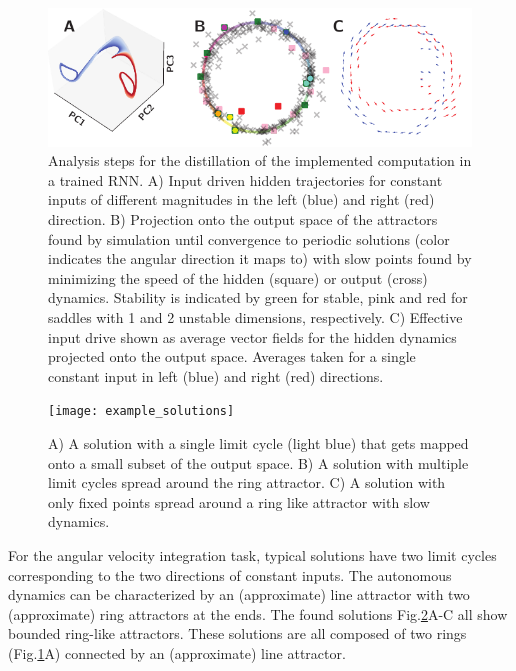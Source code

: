 \documentclass{article} %
\newcounter{ct}
\theoremstyle{definition}
\theoremstyle{remark}
\begin{document}
\begin{figure}[tbhp]
     \centering
    \includegraphics[width=\textwidth]{analysis_small}
       \caption{Analysis steps for the distillation of the implemented computation in a trained RNN. A) Input driven hidden trajectories for constant inputs of different magnitudes in the left (blue) and right (red) direction. B) Projection onto the output space of the attractors found by simulation until convergence to periodic solutions (color indicates the angular direction it maps to) with slow points found by minimizing the speed of the hidden (square) or output (cross) dynamics. Stability is indicated by green for stable, pink and red for saddles with 1 and 2 unstable dimensions, respectively. C) Effective input drive shown as average vector fields for the hidden dynamics projected onto the output space. Averages taken for a single constant input in left (blue) and right (red) directions.}
         \label{fig:asymptotic_analysis}
\end{figure}

\begin{figure}[tbhp]
     \centering
    \texttt{[image: example\_solutions]}
       \caption{A) A solution with a single limit cycle (light blue) that gets mapped onto a small subset of the output space. B) A solution with multiple limit cycles spread around the ring attractor. C) A solution with only fixed points spread around a ring like attractor with slow dynamics.}
         \label{fig:angular_solutions}
\end{figure}


For the angular velocity integration task, typical solutions have two limit cycles corresponding to the two directions of constant inputs. The autonomous dynamics can be characterized by an (approximate) line attractor with two (approximate) ring attractors at the ends. 
The found solutions Fig.\ref{fig:angular_solutions}A-C all show bounded ring-like attractors. These solutions are all composed of two rings (Fig.\ref{fig:asymptotic_analysis}A) connected by an (approximate) line attractor.
\end{document}
